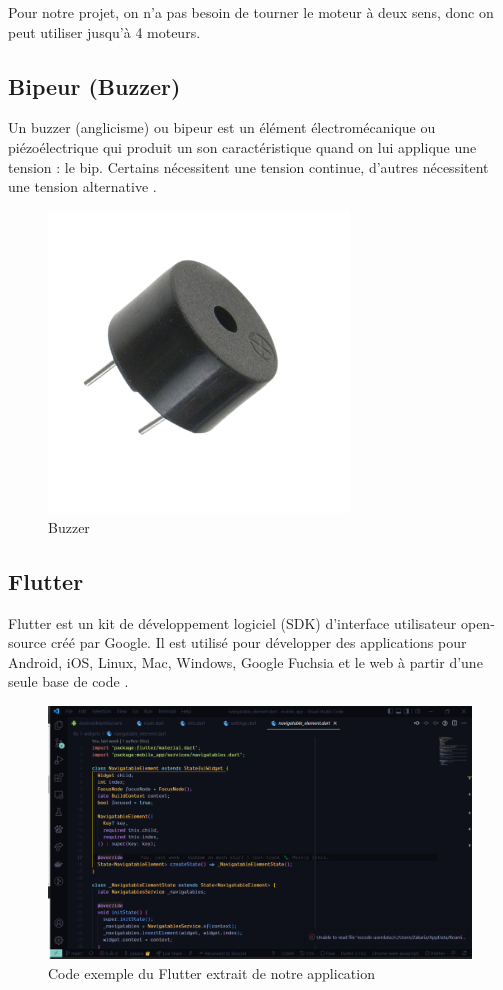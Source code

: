 \FloatBarrier

Pour notre projet, on n'a pas besoin de tourner le moteur à deux sens, donc on peut utiliser jusqu'à 4 moteurs.

\subsection{Bipeur (Buzzer)}
Un buzzer (anglicisme) ou bipeur est un élément électromécanique ou piézoélectrique qui produit un son caractéristique quand on lui applique une tension : le bip. Certains nécessitent une tension continue, d'autres nécessitent une tension alternative \cite{frwiki:178425382e}.

\begin{figure}[!htbp]
    \centering
    \includegraphics[width=8cm]{assets/buzzer.png}
    \caption{Buzzer}
\end{figure}

\FloatBarrier

\subsection{Flutter}

Flutter est un kit de développement logiciel (SDK) d'interface utilisateur open-source créé par Google. Il est utilisé pour développer des applications pour Android, iOS, Linux, Mac, Windows, Google Fuchsia et le web à partir d'une seule base de code \cite{frwiki:192185851}.

\begin{figure}[!htbp]
    \centering
    \includegraphics[width=\linewidth]{assets/flutter/example code.jpg}
    \caption{Code exemple du Flutter extrait de notre application}
\end{figure}

